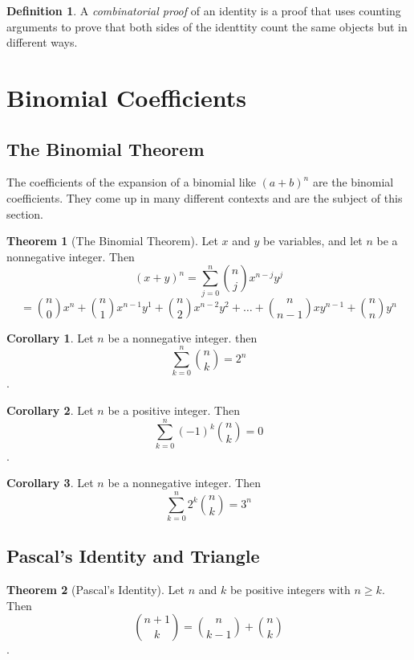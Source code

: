 \documentclass[11pt]{book} %
\theoremstyle {definition}
\newtheorem {definition}{Definition}[section]
\newtheorem {theorem}{Theorem}[section]
\newtheorem {corollary}{Corollary}[section]
\theoremstyle {remark}
\begin{document}
\begin{definition}
A \textit{combinatorial proof} of an identity is a proof that uses counting arguments to prove that both sides of the identtity count the same objects but in different ways.
\end{definition}

\section {Binomial Coefficients}
    \subsection {The Binomial Theorem}
The coefficients of the expansion of a binomial like $(a+b)^n$ are the binomial coefficients. They come up in many different contexts and are the subject of this section.

\begin{theorem}[The Binomial Theorem]
Let $x$ and $y$ be variables, and let $n$ be a nonnegative integer. Then 
$${(x+y)^n} ={ \sum_{j=0}^n}   {{ n} \choose{j}} x^{n-j}y^j$$
$$= {n \choose {0}}  {x^n}   +  
{n \choose 1      }   {x^{n-1}y^1}   +   
{n \choose 2      }   {x^{n-2}y^2} + 
\dots +
{n \choose {n-1}}   {xy^{n-1}} + 
{n \choose n      }    { y^n}$$
\end{theorem}


\begin{corollary}
Let $n$ be a nonnegative integer. then
$$\sum_{k=0}^n {n\choose k} = 2^n$$.
\end{corollary}

\begin{corollary}
Let $n$ be a positive integer. Then
$$\sum_{k=0}^n (-1)^k {n \choose k} = 0$$.
\end{corollary}

\begin{corollary}
Let $n$ be a nonnegative integer. Then
$$ \sum_{k=0}^{n}2^k {n\choose k} = 3^n$$
\end{corollary}

\subsection{Pascal's Identity and Triangle}
\begin{theorem}[Pascal's Identity]
Let $n$ and $k$ be positive integers with $n \ge k$. Then
$$ {{n+1} \choose k}  = {n \choose {k-1}} + { n \choose k}$$.
\end{theorem}
\end{document}
